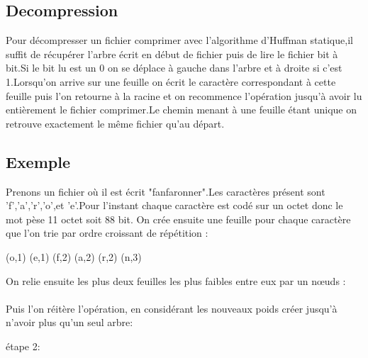 \documentclass{report}
\begin{document}
\subsection*{Decompression}
Pour décompresser un fichier comprimer avec l'algorithme d'Huffman statique,il suffit de récupérer l'arbre écrit en début de fichier puis de lire le fichier bit à bit.Si le bit lu est un 0 on se déplace à gauche dans l'arbre et à droite si c'est 1.Lorsqu'on arrive sur une feuille on écrit le caractère correspondant à cette feuille puis l'on retourne à la racine et on recommence l'opération jusqu'à avoir lu entièrement le fichier comprimer.Le chemin menant à une feuille étant unique on retrouve exactement le même fichier qu'au départ.
\subsection*{Exemple}
Prenons un fichier où il est écrit "fanfaronner".Les caractères présent sont 'f','a','r','o',et 'e'.Pour l'instant chaque caractère est codé sur un octet donc le mot pèse 11 octet soit 88 bit.
On crée ensuite une feuille pour chaque caractère que l'on trie par ordre croissant de répétition :
\begin{center}
(o,1) (e,1) (f,2) (a,2) (r,2) (n,3)
\end{center}
On relie ensuite les plus deux feuilles les plus faibles entre eux par un nœuds :
\begin{center}
\end{center}
\paragraph*{}
Puis l'on réitère l'opération, en considérant les nouveaux poids créer jusqu'à n'avoir plus qu'un seul arbre:

étape 2:

\end{document}
